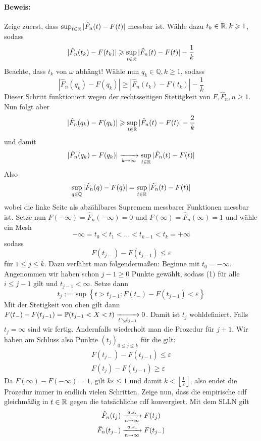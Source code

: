 \paragraph{Beweis:} Zeige zuerst, dass $\sup_{t\in\mathbb{R}}|\hat{F}_n(t)-F(t)|$ messbar ist. W\"ahle dazu $t_k\in\mathbb{R},k\geqslant 1$, sodass 
	$$|\hat{F}_n(t_k)-F(t_k)|\geqslant\sup_{t\in\mathbb{R}}|\hat{F}_n(t)-F(t)|-\dfrac{1}{k}$$
Beachte, dass $t_k$ von $\omega$ abh\"angt! W\"ahle nun $q_k\in\mathbb{Q},k\geq1$, sodass
	$$|\hat{F}_n(q_k)-F(q_k)|\geq | \hat{F}_n(t_k)-F(t_k)|-\dfrac{1}{k}$$
Dieser Schritt funktioniert wegen der rechtsseitigen Stetitgkeit von $F,\hat{F}_n,n\geq 1$. Nun folgt aber 
	$$|\hat{F}_n(q_k)-F(q_k)|\geqslant\sup_{t\in\mathbb{R}}|\hat{F}_n(t)-F(t)|-\dfrac{2}{k}$$
und damit 
	$$|\hat{F}_n(q_k)-F(q_k)|\nto{}{k\to\infty}\sup_{t\in\R}|\hat{F}_n(t)-F(t)|$$
Also 
	$$\sup_{q\in\mathbb{Q}}|\hat{F}_n(q)-F(q)|=\sup_{t\in\mathbb{R}}|\hat{F}_n(t)-F(t)|$$
wobei die linke Seite als abz\"ahlbares Supremem messbarer Funktionen messbar ist. \newline
Setze nun $F(-\infty)=\hat{F}_n(-\infty)=0$ und $F(\infty)=\hat{F}_n(\infty)=1$ und w\"ahle ein Mesh$$-\infty=t_0<t_1<\hdots<t_{k-1}<t_k=+\infty$$
sodass 
\begin{equation}
    F(t_{j-})-F(t_{j-1})\leq\varepsilon 
\end{equation}
f\"ur $1\leq j\leq k$. Dazu verf\"ahrt man folgenderma\ss{}en:\newline
Beginne mit $t_0=-\infty$. Angenommen wir haben schon $j-1\geq 0$ Punkte gew\"ahlt, sodass (1) f\"ur alle $i\leq j-1$ gilt und $t_{j-1}<\infty$. Setze dann
    $$t_j:=\sup \left\{ t>t_{j-1}:F(t_-)-F(t_{j-1})<\varepsilon\right\}$$
Mit der Stetigkeit von oben gilt dann $F(t_-)-F(t_{j-1})=\Pp(t_{j-1}<X<t)\nto{}{t\searrow t_{j-1}}0$. Damit ist $t_j$ wohldefiniert. Falls $t_j=\infty$ sind wir fertig. Andernfalls wiederholt man die Prozedur f\"ur $j+1$. Wir haben am Schluss also Punkte $(t_j)_{0\leq j\leq k}$ f\"ur die gilt:
\begin{align*}
	F(t_{j-})-F(t_{j-1})\leq\varepsilon \\
	F(t_j)-F(t_{j-1})\geq\varepsilon
\end{align*}
Da $F(\infty)-F(-\infty)=1$, gilt $k\varepsilon\leq 1$ und damit $k<\left\lfloor\frac{1}{\varepsilon}\right\rfloor$, also endet die Prozedur immer in endlich vielen Schritten.\newline
Zeige nun, dass die empirische cdf gleichm\"a\ss{}ig in $t\in\mathbb{R}$ gegen die tats\"achliche cdf konvergiert. Mit dem SLLN gilt 
\begin{align}
    \hat{F}_n(t_j)&\nto{a.s.}{n\to\infty}F(t_j) \\
	\hat{F}_n(t_{j-})&\nto{a.s.}{n\to\infty}F(t_{j-})
\end{align}
